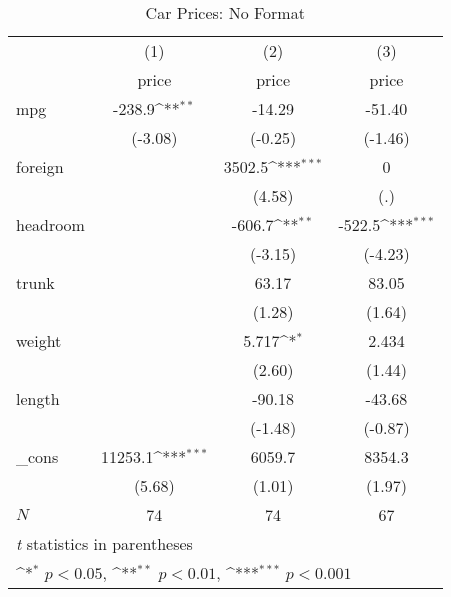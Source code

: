 \begin{table}[htbp]\centering
\def\sym#1{\ifmmode^{#1}\else\(^{#1}\)\fi}
\caption{Car Prices: No Format}
\begin{tabular}{l*{3}{c}}
\hline\hline
            &\multicolumn{1}{c}{(1)}&\multicolumn{1}{c}{(2)}&\multicolumn{1}{c}{(3)}\\
            &\multicolumn{1}{c}{price}&\multicolumn{1}{c}{price}&\multicolumn{1}{c}{price}\\
\hline
mpg         &      -238.9\sym{**} &      -14.29         &      -51.40         \\
            &     (-3.08)         &     (-0.25)         &     (-1.46)         \\
[1em]
foreign     &                     &      3502.5\sym{***}&           0         \\
            &                     &      (4.58)         &         (.)         \\
[1em]
headroom    &                     &      -606.7\sym{**} &      -522.5\sym{***}\\
            &                     &     (-3.15)         &     (-4.23)         \\
[1em]
trunk       &                     &       63.17         &       83.05         \\
            &                     &      (1.28)         &      (1.64)         \\
[1em]
weight      &                     &       5.717\sym{*}  &       2.434         \\
            &                     &      (2.60)         &      (1.44)         \\
[1em]
length      &                     &      -90.18         &      -43.68         \\
            &                     &     (-1.48)         &     (-0.87)         \\
[1em]
\_cons      &     11253.1\sym{***}&      6059.7         &      8354.3         \\
            &      (5.68)         &      (1.01)         &      (1.97)         \\
\hline
\(N\)       &          74         &          74         &          67         \\
\hline\hline
\multicolumn{4}{l}{\footnotesize \textit{t} statistics in parentheses}\\
\multicolumn{4}{l}{\footnotesize \sym{*} \(p<0.05\), \sym{**} \(p<0.01\), \sym{***} \(p<0.001\)}\\
\end{tabular}
\end{table}
